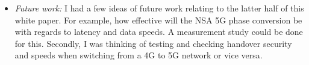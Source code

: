 \documentclass[letterpaper,twocolumn,10pt]{article}
\begin{document}
\begin{itemize}
\item {\it Future work:} 
I had a few ideas of future work relating to the latter half of this white paper. For example, how effective will the NSA
5G phase conversion be with regards to latency and data speeds. A measurement study could be done for this. 
Secondly, I was thinking of testing and checking handover security and speeds when switching from a 4G to
5G network or vice versa. 

\end{itemize}

{
  \small 
  
  
}
\end{document}
